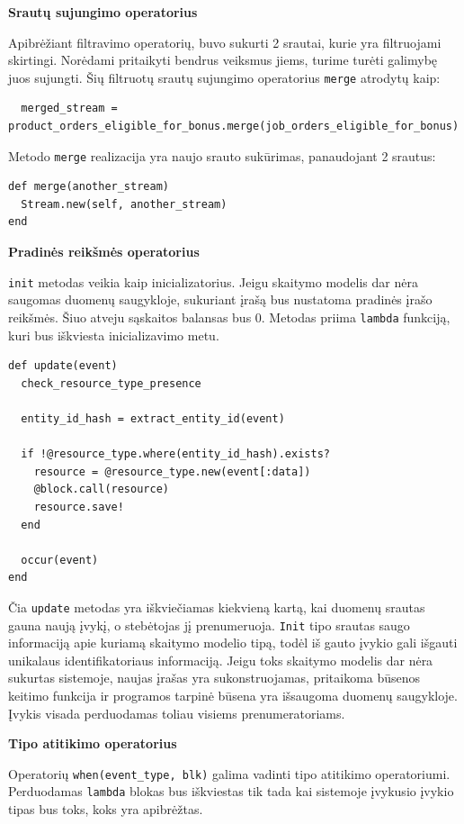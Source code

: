 \textbf{Srautų sujungimo operatorius}

Apibrėžiant filtravimo operatorių, buvo sukurti 2 srautai, kurie yra filtruojami skirtingi. Norėdami pritaikyti bendrus veiksmus jiems, turime turėti galimybę juos sujungti. Šių filtruotų srautų sujungimo operatorius \lstinline|merge| atrodytų kaip:

\begin{lstlisting}
  merged_stream = product_orders_eligible_for_bonus.merge(job_orders_eligible_for_bonus)
\end{lstlisting}

Metodo \lstinline|merge| realizacija yra naujo srauto sukūrimas, panaudojant 2 srautus:

\begin{lstlisting}
def merge(another_stream)
  Stream.new(self, another_stream)
end
\end{lstlisting}

\textbf{Pradinės reikšmės operatorius}

\lstinline|init| metodas veikia kaip inicializatorius. Jeigu skaitymo modelis dar nėra saugomas duomenų saugykloje, sukuriant įrašą bus nustatoma pradinės įrašo reikšmės. Šiuo atveju sąskaitos balansas bus 0. Metodas priima \lstinline|lambda| funkciją, kuri bus iškviesta inicializavimo metu.

\begin{lstlisting}
def update(event)
  check_resource_type_presence

  entity_id_hash = extract_entity_id(event)

  if !@resource_type.where(entity_id_hash).exists?
    resource = @resource_type.new(event[:data])
    @block.call(resource)
    resource.save!
  end

  occur(event)
end
\end{lstlisting}

Čia \lstinline|update| metodas yra iškviečiamas kiekvieną kartą, kai duomenų srautas gauna naują įvykį, o stebėtojas jį prenumeruoja. \lstinline|Init| tipo srautas saugo informaciją apie kuriamą skaitymo modelio tipą, todėl iš gauto įvykio gali išgauti unikalaus identifikatoriaus informaciją. Jeigu toks skaitymo modelis dar nėra sukurtas sistemoje, naujas įrašas yra sukonstruojamas, pritaikoma būsenos keitimo funkcija ir programos tarpinė būsena yra išsaugoma duomenų saugykloje. Įvykis visada perduodamas toliau visiems prenumeratoriams.

\textbf{Tipo atitikimo operatorius}

Operatorių \lstinline|when(event_type, blk)| galima vadinti tipo atitikimo operatoriumi. Perduodamas \lstinline|lambda| blokas bus iškviestas tik tada kai sistemoje įvykusio įvykio tipas bus toks, koks yra apibrėžtas.

